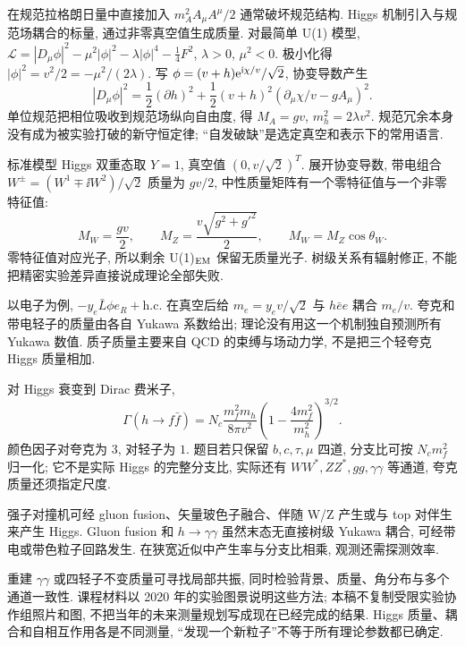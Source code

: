 \label{ch:higgs}
在规范拉格朗日量中直接加入 $m_A^2A_\mu A^\mu/2$ 通常破坏规范结构. Higgs 机制引入与规范场耦合的标量, 通过非零真空值生成质量. 对最简单 U(1) 模型,
$\mathcal L=|D_\mu\phi|^2-\mu^2|\phi|^2-\lambda|\phi|^4-\tfrac14F^2$, $\lambda>0$, $\mu^2<0$. 极小化得 $|\phi|^2=v^2/2=-\mu^2/(2\lambda)$. 写 $\phi=(v+h)\mathrm e^{\mathrm i\chi/v}/\sqrt2$, 协变导数产生
\begin{equation}
 |D_\mu\phi|^2=\frac12(\partial h)^2+\frac12(v+h)^2(\partial_\mu\chi/v-gA_\mu)^2.
\end{equation}
单位规范把相位吸收到规范场纵向自由度, 得 $M_A=gv$, $m_h^2=2\lambda v^2$. 规范冗余本身没有成为被实验打破的新守恒定律; ``自发破缺''是选定真空和表示下的常用语言.

标准模型 Higgs 双重态取 $Y=1$, 真空值 $(0,v/\sqrt2)^T$. 展开协变导数, 带电组合 $W^\pm=(W^1\mp\ii W^2)/\sqrt2$ 质量为 $gv/2$, 中性质量矩阵有一个零特征值与一个非零特征值:
\begin{equation}
 M_W=\frac{gv}2,\qquad M_Z=\frac{v\sqrt{g^2+g'^2}}2,
 \qquad M_W=M_Z\cos\theta_W.
\end{equation}
零特征值对应光子, 所以剩余 U(1)$_{\rm EM}$ 保留无质量光子. 树级关系有辐射修正, 不能把精密实验差异直接说成理论全部失败.

以电子为例, $-y_e\bar L\phi e_R+\mathrm{h.c.}$ 在真空后给 $m_e=y_ev/\sqrt2$ 与 $h\bar ee$ 耦合 $m_e/v$. 夸克和带电轻子的质量由各自 Yukawa 系数给出; 理论没有用这一个机制独自预测所有 Yukawa 数值. 质子质量主要来自 QCD 的束缚与场动力学, 不是把三个轻夸克 Higgs 质量相加.

对 Higgs 衰变到 Dirac 费米子,
\begin{equation}
 \Gamma(h\to f\bar f)=N_c\frac{m_f^2m_h}{8\pi v^2}
 \left(1-\frac{4m_f^2}{m_h^2}\right)^{3/2}.
\end{equation}
颜色因子对夸克为 $3$, 对轻子为 $1$. 题目若只保留 $b,c,\tau,\mu$ 四道, 分支比可按 $N_cm_f^2$ 归一化; 它不是实际 Higgs 的完整分支比, 实际还有 $WW^*,ZZ^*,gg,\gamma\gamma$ 等通道, 夸克质量还须指定尺度.

强子对撞机可经 gluon fusion、矢量玻色子融合、伴随 W/Z 产生或与 top 对伴生来产生 Higgs. Gluon fusion 和 $h\to\gamma\gamma$ 虽然末态无直接树级 Yukawa 耦合, 可经带电或带色粒子回路发生. 在狭宽近似中产生率与分支比相乘, 观测还需探测效率.

重建 $\gamma\gamma$ 或四轻子不变质量可寻找局部共振, 同时检验背景、质量、角分布与多个通道一致性. 课程材料以 2020 年的实验图景说明这些方法; 本稿不复制受限实验协作组照片和图, 不把当年的未来测量规划写成现在已经完成的结果. Higgs 质量、耦合和自相互作用各是不同测量, ``发现一个新粒子''不等于所有理论参数都已确定.
